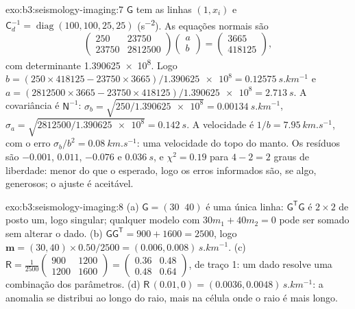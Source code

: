 \begin{solution}{exo:b3:seismology-imaging:7}
$\mathsf G$ tem as linhas $(1, x_i)$ e $\mathsf C_d^{-1} = \operatorname{diag}
(100, 100, 25, 25)$ (\unit{s^{-2}}). As equações normais são
\[
  \begin{pmatrix} 250 & 23750 \\ 23750 & \num{2812500} \end{pmatrix}
  \begin{pmatrix} a \\ b \end{pmatrix}
  = \begin{pmatrix} 3665 \\ 418125 \end{pmatrix},
\]
com determinante \num{1.390625e8}. Logo $b = (250\times418125 -
23750\times3665)/\num{1.390625e8} = \qty{0.12575}{s.km^{-1}}$ e
$a = (2812500\times3665 - 23750\times418125)/\num{1.390625e8} =
\qty{2.713}{s}$. A covariância é $\mathsf N^{-1}$: $\sigma_b =
\sqrt{250/\num{1.390625e8}} = \qty{0.00134}{s.km^{-1}}$, $\sigma_a =
\sqrt{2812500/\num{1.390625e8}} = \qty{0.142}{s}$. A velocidade é
$1/b = \qty{7.95}{km.s^{-1}}$, com o erro $\sigma_b/b^2 =
\qty{0.08}{km.s^{-1}}$: uma velocidade do topo do manto. Os resíduos são $-0.001$,
$0.011$, $-0.076$ e $\qty{0.036}{s}$, e $\chi^2 = 0.19$ para $4 - 2 = 2$
graus de liberdade: menor do que o esperado, logo os erros informados são, se algo, generosos;
o ajuste é aceitável.
\end{solution}

\begin{solution}{exo:b3:seismology-imaging:8}
(a) $\mathsf G = (30\;\;40)$ é uma única linha: $\mathsf G^{\mathsf T}\mathsf G$ é
$2\times2$ de posto um, logo singular; qualquer modelo com $30m_1 + 40m_2 = 0$ pode
ser somado sem alterar o dado. (b) $\mathsf G\mathsf G^{\mathsf T} =
900 + 1600 = 2500$, logo $\mathbf m = (30, 40)\times0.50/2500 =
(0.006, 0.008)\,\unit{s.km^{-1}}$. (c) $\mathsf R = \frac{1}{2500}
\begin{pmatrix} 900 & 1200 \\ 1200 & 1600 \end{pmatrix} =
\begin{pmatrix} 0.36 & 0.48 \\ 0.48 & 0.64 \end{pmatrix}$, de traço 1: um
dado resolve uma combinação dos parâmetros. (d) $\mathsf R\,(0.01, 0) =
(0.0036, 0.0048)\,\unit{s.km^{-1}}$: a anomalia se distribui ao longo do raio, mais
na célula onde o raio é mais longo.
\end{solution}

